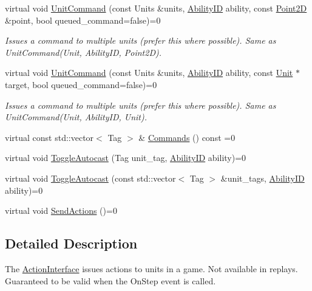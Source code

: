 \begin{DoxyCompactItemize}
virtual void \hyperlink{classsc2_1_1_action_interface_aeea8f2ca32bfe3ee1835bddb9d1356f1}{Unit\+Command} (const Units \&units, \hyperlink{classsc2_1_1_s_c2_type}{Ability\+ID} ability, const \hyperlink{structsc2_1_1_point2_d}{Point2D} \&point, bool queued\+\_\+command=false)=0
\begin{DoxyCompactList}\small\item\em Issues a command to multiple units (prefer this where possible). Same as Unit\+Command(\+Unit, Ability\+I\+D, Point2\+D). \end{DoxyCompactList}\item 
\mbox{\label{classsc2_1_1_action_interface_a4999034a61ca0ebb95b722af8e305a21}} 
virtual void \hyperlink{classsc2_1_1_action_interface_a4999034a61ca0ebb95b722af8e305a21}{Unit\+Command} (const Units \&units, \hyperlink{classsc2_1_1_s_c2_type}{Ability\+ID} ability, const \hyperlink{classsc2_1_1_unit}{Unit} $\ast$target, bool queued\+\_\+command=false)=0
\begin{DoxyCompactList}\small\item\em Issues a command to multiple units (prefer this where possible). Same as Unit\+Command(\+Unit, Ability\+I\+D, Unit). \end{DoxyCompactList}\item 
virtual const std\+::vector$<$ Tag $>$ \& \hyperlink{classsc2_1_1_action_interface_a29a55f8dd4f9230864caa1deb228ae33}{Commands} () const =0
\item 
virtual void \hyperlink{classsc2_1_1_action_interface_a5f66f9b7eaf1d6a681694927b8605004}{Toggle\+Autocast} (Tag unit\+\_\+tag, \hyperlink{classsc2_1_1_s_c2_type}{Ability\+ID} ability)=0
\item 
virtual void \hyperlink{classsc2_1_1_action_interface_ab3990c306215b3cb8d5e62533f72db62}{Toggle\+Autocast} (const std\+::vector$<$ Tag $>$ \&unit\+\_\+tags, \hyperlink{classsc2_1_1_s_c2_type}{Ability\+ID} ability)=0
\item 
virtual void \hyperlink{classsc2_1_1_action_interface_af054d2a35e7eb740109f63011090ea50}{Send\+Actions} ()=0
\end{DoxyCompactItemize}


\subsection{Detailed Description}
The \hyperlink{classsc2_1_1_action_interface}{Action\+Interface} issues actions to units in a game. Not available in replays. Guaranteed to be valid when the On\+Step event is called. 

